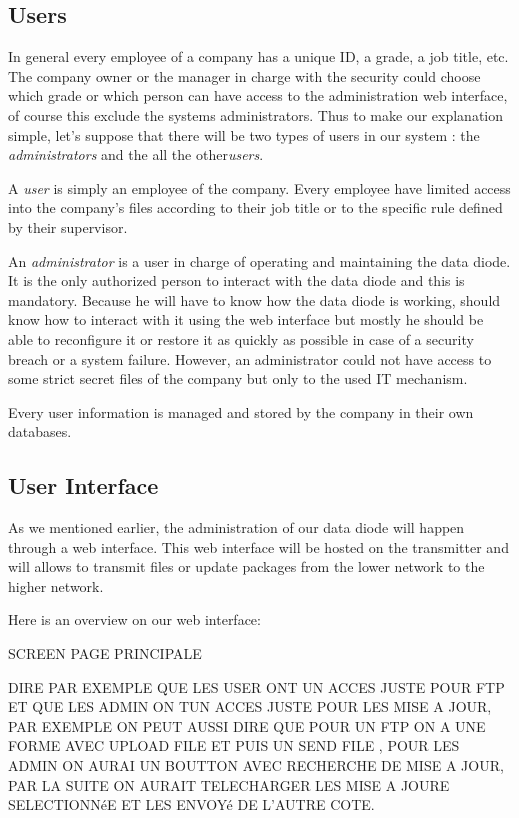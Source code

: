 \documentclass[a4paper,10pt]{article}
\begin{document}
\subsection{Users} 
In general every employee of a company has a unique ID, a grade, a job title, etc. The company owner or the manager in charge with the security could choose which grade or which person can have access to the administration web interface, of course this exclude the systems administrators.  Thus to make our explanation simple, let's suppose that there will be two types of users in our system : the \textit{administrators} and the all the other\textit{users}.

A \textit{user} is simply an employee of the company. Every employee have limited access into the company's files according to their job title or to the specific rule defined by their supervisor.

An \textit{administrator} is a user in charge of operating and maintaining the data diode. It is the only authorized person to interact with the data diode and this is mandatory. Because he will have to know how the data diode is working, should know how to interact with it using the web interface but mostly he should be able to reconfigure it or restore it as quickly as possible in case of a security breach or a system failure. However, an administrator could not have access to some strict secret files of the company but only to the used IT mechanism.

Every user information is managed and stored by the company in their own databases.
\subsection{User Interface}\label{UI}

As we mentioned earlier, the administration of our data diode will happen through a web interface. This web interface will be hosted on the transmitter and will allows to transmit files or update packages from the lower network to the higher network.

Here is an overview on our web interface:

SCREEN PAGE PRINCIPALE

DIRE PAR EXEMPLE QUE LES USER ONT UN ACCES JUSTE POUR FTP ET QUE LES ADMIN ON TUN ACCES JUSTE POUR LES MISE A JOUR, PAR EXEMPLE ON PEUT AUSSI DIRE QUE POUR UN FTP ON A UNE FORME AVEC UPLOAD FILE ET PUIS UN SEND FILE , POUR LES ADMIN ON AURAI UN BOUTTON AVEC RECHERCHE DE MISE A JOUR, PAR LA SUITE ON AURAIT TELECHARGER LES MISE A JOURE SELECTIONNéE ET LES ENVOYé DE L'AUTRE COTE. 
\end{document}
